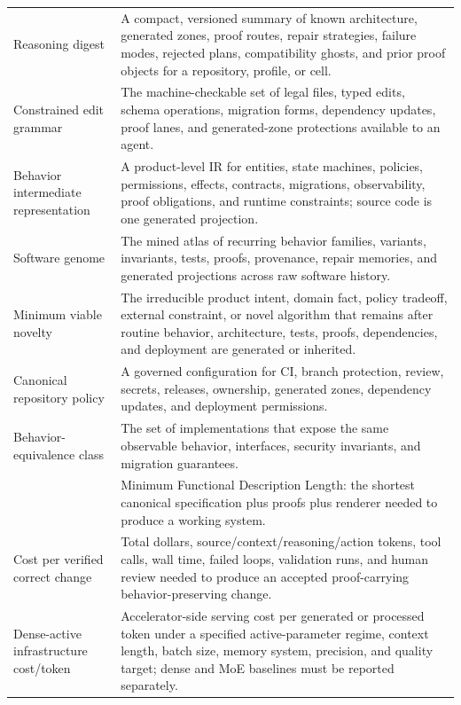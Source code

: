 \begin{table}[t]
\begin{tabularx}{\textwidth}{p{}X}
Reasoning digest & A compact, versioned summary of known architecture, generated zones, proof routes, repair strategies, failure modes, rejected plans, compatibility ghosts, and prior proof objects for a repository, profile, or cell. \\
Constrained edit grammar & The machine-checkable set of legal files, typed edits, schema operations, migration forms, dependency updates, proof lanes, and generated-zone protections available to an agent. \\
Behavior intermediate representation & A product-level IR for entities, state machines, policies, permissions, effects, contracts, migrations, observability, proof obligations, and runtime constraints; source code is one generated projection. \\
Software genome & The mined atlas of recurring behavior families, variants, invariants, tests, proofs, provenance, repair memories, and generated projections across raw software history. \\
Minimum viable novelty & The irreducible product intent, domain fact, policy tradeoff, external constraint, or novel algorithm that remains after routine behavior, architecture, tests, proofs, dependencies, and deployment are generated or inherited. \\
Canonical repository policy & A governed configuration for CI, branch protection, review, secrets, releases, ownership, generated zones, dependency updates, and deployment permissions. \\
Behavior-equivalence class & The set of implementations that expose the same observable behavior, interfaces, security invariants, and migration guarantees. \\
\mfdl{} & Minimum Functional Description Length: the shortest canonical specification plus proofs plus renderer needed to produce a working system. \\
Cost per verified correct change & Total dollars, source/context/reasoning/action tokens, tool calls, wall time, failed loops, validation runs, and human review needed to produce an accepted proof-carrying behavior-preserving change. \\
Dense-active infrastructure cost/token & Accelerator-side serving cost per generated or processed token under a specified active-parameter regime, context length, batch size, memory system, precision, and quality target; dense and MoE baselines must be reported separately. \\
\bottomrule
\end{tabularx}
\end{table}

